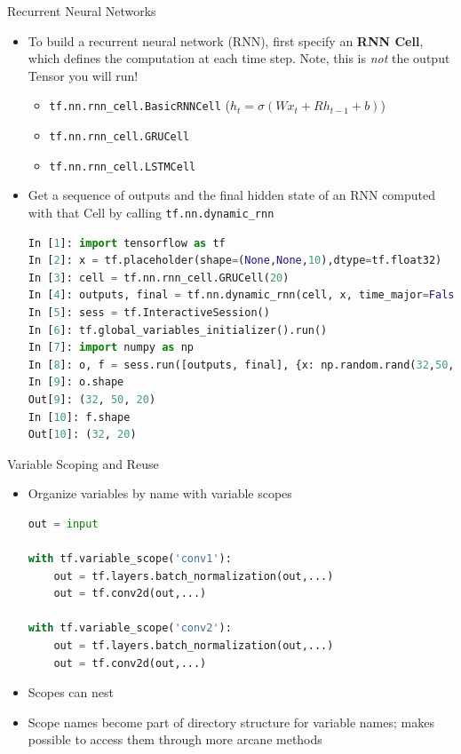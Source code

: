 \documentclass[]{beamer}
\begin{document}
\begin{frame}[fragile]{Recurrent Neural Networks}

\begin{itemize}
\item To build a recurrent neural network (RNN), first specify an \textbf{RNN Cell}, which defines the computation at each time step. Note, this is \textit{not} the output Tensor you will run!
\begin{itemize}
\item \verb|tf.nn.rnn_cell.BasicRNNCell| ($h_t = \sigma(Wx_t + Rh_{t-1}+ b)$)
\item \verb|tf.nn.rnn_cell.GRUCell|
\item \verb|tf.nn.rnn_cell.LSTMCell|
\end{itemize}
\item Get a sequence of outputs and the final hidden state of an RNN computed with that Cell by calling \verb|tf.nn.dynamic_rnn|

\lstset{style=mystyle2}
\begin{lstlisting}[language=python]
In [1]: import tensorflow as tf
In [2]: x = tf.placeholder(shape=(None,None,10),dtype=tf.float32)
In [3]: cell = tf.nn.rnn_cell.GRUCell(20)
In [4]: outputs, final = tf.nn.dynamic_rnn(cell, x, time_major=False, dtype=tf.float32)
In [5]: sess = tf.InteractiveSession()
In [6]: tf.global_variables_initializer().run()
In [7]: import numpy as np
In [8]: o, f = sess.run([outputs, final], {x: np.random.rand(32,50,10)})
In [9]: o.shape
Out[9]: (32, 50, 20)
In [10]: f.shape
Out[10]: (32, 20)

\end{lstlisting}
\lstset{style=mystyle}

\end{itemize}

\end{frame}

\begin{frame}[fragile]{Variable Scoping and Reuse}

\begin{itemize}
\item Organize variables by name with variable scopes
\begin{lstlisting}[language=python]
out = input

with tf.variable_scope('conv1'):
    out = tf.layers.batch_normalization(out,...)
    out = tf.conv2d(out,...)

with tf.variable_scope('conv2'):
    out = tf.layers.batch_normalization(out,...)
    out = tf.conv2d(out,...)

\end{lstlisting}
\item Scopes can nest
\item Scope names become part of directory structure for variable names; makes possible to access them through more arcane methods
\end{itemize}
\end{frame}
\end{document}
